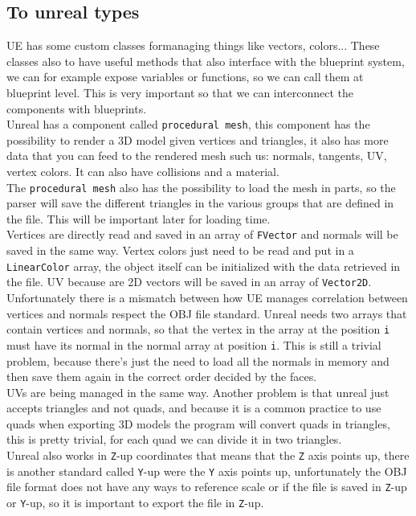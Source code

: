 \subsection{To unreal types}
\noindent
\ac{UE} has some custom classes formanaging things like vectors, colors... These classes also to have useful methods that also interface with the blueprint system, we can for example expose variables or functions, so we can call them at blueprint level.
This is very important so that we can interconnect the \cpp components with blueprints.\\
Unreal has a component called \verb|procedural mesh|, this component has the possibility to render a 3D model given vertices and triangles, it also has more data that you can feed to the rendered mesh such  us: normals, tangents, UV, vertex colors.
It can also have collisions and a material.\\
The \verb|procedural mesh| also has the possibility to load the mesh in parts, so the parser will save the different triangles in the various groups that are defined in the file.
This will be important later for loading time.\\
Vertices are directly read and saved in an array of \verb|FVector| and normals will be saved in the same way.
Vertex colors just need to be read and put in a \verb|LinearColor| array, the object itself can be initialized with the data retrieved in the file.
UV because are 2D vectors will be saved in an array of \verb|Vector2D|.
Unfortunately there is a mismatch between how \ac{UE} manages correlation between vertices and normals respect the OBJ file standard.
Unreal needs two arrays that contain vertices and normals, so that the vertex in the array at the position \verb|i| must have its normal in the normal array at position \verb|i|. 
This is still a trivial problem, because there's just the need to load all the normals in memory and then save them again in the correct order decided by the faces.\\
UVs are being managed in the same way.
Another problem is that unreal just accepts triangles and not quads, and because it is a common practice to use quads when exporting 3D models the program will convert quads in triangles, this is pretty trivial, for each quad we can divide it in two triangles.\\
Unreal also works in \verb|Z|-up coordinates that means that the \verb|Z| axis points up, there is another standard called \verb|Y|-up were the \verb|Y| axis points up, unfortunately the OBJ file format does not have any ways to reference scale or if the file is saved in \verb|Z|-up or \verb|Y|-up,
so it is important to export the file in \verb|Z|-up.\\

